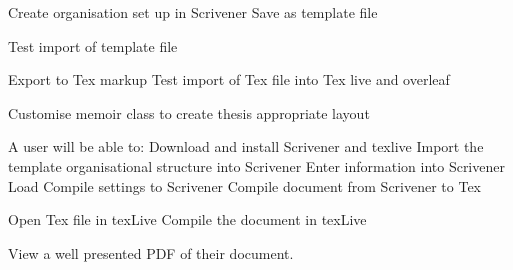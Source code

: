 \documentclass{article}
\begin{document}
Create organisation set up in Scrivener
Save as template file

Test import of template file

Export to Tex markup
Test import of Tex file into Tex live and overleaf

Customise memoir class to create thesis appropriate layout


A user will be able to:
Download and install Scrivener and texlive
Import the template organisational structure into Scrivener
Enter information into Scrivener
Load Compile settings to Scrivener
Compile document from Scrivener to Tex


Open Tex file in texLive
Compile the document in texLive 

View a well presented PDF of their document.
\end{document}
